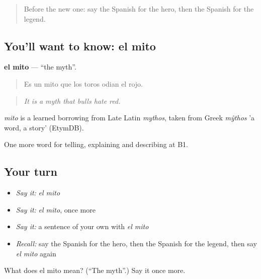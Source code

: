 \label{lesson:ES-C564-mito}



\begin{quote}
Before the new one: say the Spanish for the hero, then the Spanish for the legend.
\end{quote}

\subsection*{You'll want to know: el mito}
\textbf{el mito} — \textquotedblleft{}the myth\textquotedblright{}.

\begin{quote}
Es un mito que los toros odian el rojo.
\end{quote}

\begin{quote}
\emph{It is a myth that bulls hate red.}
\end{quote}

\begin{cousinweb}
\emph{mito} is a learned borrowing from Late Latin \emph{mythos}, taken from Greek \emph{mŷthos} 'a word, a story' (EtymDB).
\end{cousinweb}

\begin{grammarlens}[title={What you've built}]
One more word for telling, explaining and describing at B1.
\end{grammarlens}

\subsection*{Your turn}
\begin{itemize}
\raggedright
  \item \emph{Say it:} \emph{el mito}
  \item \emph{Say it:} \emph{el mito}, once more
  \item \emph{Say it:} a sentence of your own with \emph{el mito}
  \item \emph{Recall:} say the Spanish for the hero, then the Spanish for the legend, then say \emph{el mito} again
\end{itemize}

\begin{tcolorbox}[breakable,colback=teal!4,colframe=teal!35!black,title={Before you move on}]
What does el mito mean? (\textquotedblleft{}The myth\textquotedblright{}.) Say it once more.
\end{tcolorbox}
